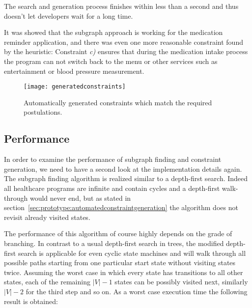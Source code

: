 The search and generation process finishes within less than a second and thus doesn't let developers wait for a long time.

It was showed that the subgraph approach is working for the medication reminder application, and there was even one more reasonable constraint found by the heuristic: Constraint \emph{c)} ensures that during the medication intake process the program can not switch back to the menu or other services such as entertainment or blood pressure measurement.



\begin{figure}[htbp]
  \centering
  \texttt{[image: generatedconstraints]}
  \caption{Automatically generated constraints which match the required postulations.}
  \label{fig:generatedconstraints}
\end{figure}






\subsection{Performance}

In order to examine the performance of subgraph finding and constraint generation, we need to have a second look at the implementation details again. The subgraph finding algorithm is realized similar to a depth-first search. Indeed all healthcare programs are infinite and contain cycles and a depth-first walk-through would never end, but as stated in section~\ref{sec:prototype:automatedconstraintgeneration} the algorithm does not revisit already visited states.

The performance of this algorithm of course highly depends on the grade of branching. In contrast to a usual depth-first search in trees, the modified depth-first search is applicable for even cyclic state machines and will walk through all possible paths starting from one particular start state without visiting states twice. Assuming the worst case in which every state has transitions to all other states, each of the remaining $|V|-1$ states can be possibly visited next, similarly $|V|-2$ for the third step and so on. As a worst case execution time the following result is obtained:


